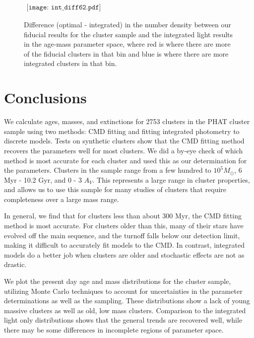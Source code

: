 \documentclass{emulateapj}
\begin{document}
\begin{figure}[ht!]
   \begin{center}$
      \begin{array}{cc}
         \texttt{[image: int\_diff62.pdf]} 
      \end{array}$
   \end{center}
  \caption{Difference (optimal - integrated) in the number density between our fiducial results for the cluster sample and the integrated light results in the age-mass parameter space, where red is where there are more of the fiducial clusters in that bin and blue is where there are more integrated clusters in that bin.}
  \label{fig:intdiff}
\end{figure}

\section{Conclusions}\label{sec:conc}

We calculate ages, masses, and extinctions for 2753 clusters in the PHAT cluster sample using two methods:  CMD fitting and fitting integrated photometry to discrete models.  Tests on synthetic clusters show that the CMD fitting method recovers the parameters well for most clusters.  We did a by-eye check of which method is most accurate for each cluster and used this as our determination for the parameters.  Clusters in the sample range from a few hundred to $10^5 M_{\odot}$, 6 Myr - 10.2 Gyr, and 0 - 3 $A_V$.  This represents a large range in cluster properties, and allows us to use this sample for many studies of clusters that require completeness over a large mass range.

In general, we find that for clusters less than about 300 Myr, the CMD fitting method is most accurate.  For clusters older than this, many of their stars have evolved off the main sequence, and the turnoff falls below our detection limit, making it difficult to accurately fit models to the CMD.  In contrast, integrated models do a better job when clusters are older and stochastic effects are not as drastic.

We plot the present day age and mass distributions for the cluster sample, utilizing Monte Carlo techniques to account for uncertainties in the parameter determinations as well as the sampling.  These distributions show a lack of young massive clusters as well as old, low mass clusters.  Comparison to the integrated light only distributions shows that the general trends are recovered well, while there may be some differences in incomplete regions of parameter space.
\end{document}
